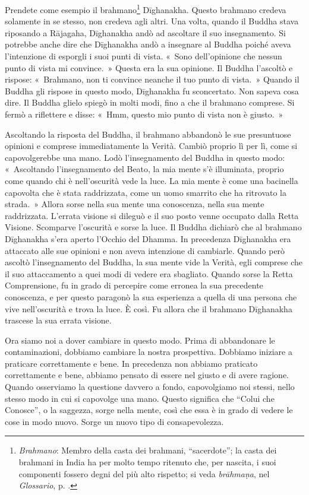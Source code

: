 Prendete come esempio il brahmano\footnote{\emph{Brahmano}: Membro della casta
  dei brahmani, ``sacerdote''; la casta dei brahmani in India ha per
  molto tempo ritenuto che, per nascita, i suoi componenti fossero degni
  del più alto rispetto; si veda \emph{brāhmaṇa}, nel \emph{Glossario}, p. \pageref{glossary-brahmana}.}
Dīghanakha. Questo brahmano credeva solamente in se stesso, non credeva
agli altri. Una volta, quando il Buddha stava riposando a Rājagaha,
Dīghanakha andò ad ascoltare il suo insegnamento. Si potrebbe anche dire
che Dīghanakha andò a insegnare al Buddha poiché aveva l'intenzione di
esporgli i suoi punti di vista. «~Sono dell'opinione che nessun punto di
vista mi convince.~» Questa era la sua opinione. Il Buddha l'ascoltò e
rispose: «~Brahmano, non ti convince neanche il tuo punto di vista.~»
Quando il Buddha gli rispose in questo modo, Dīghanakha fu sconcertato.
Non sapeva cosa dire. Il Buddha glielo spiegò in molti modi, fino a che
il brahmano comprese. Si fermò a riflettere e disse: «~Hmm, questo mio
punto di vista non è giusto.~»

Ascoltando la risposta del Buddha, il brahmano abbandonò le sue
presuntuose opinioni e comprese immediatamente la Verità. Cambiò proprio
lì per lì, come si capovolgerebbe una mano. Lodò l'insegnamento del
Buddha in questo modo: «~Ascoltando l'insegnamento del Beato, la mia
mente s'è illuminata, proprio come quando chi è nell'oscurità vede la
luce. La mia mente è come una bacinella capovolta che è stata
raddrizzata, come un uomo smarrito che ha ritrovato la strada.~» Allora
sorse nella sua mente una conoscenza, nella sua mente raddrizzata.
L'errata visione si dileguò e il suo posto venne occupato dalla Retta
Visione. Scomparve l'oscurità e sorse la luce. Il Buddha dichiarò che al
brahmano Dīghanakha s'era aperto l'Occhio del Dhamma. In precedenza
Dīghanakha era attaccato alle sue opinioni e non aveva intenzione di
cambiarle. Quando però ascoltò l'insegnamento del Buddha, la sua mente
vide la Verità, egli comprese che il suo attaccamento a quei modi di
vedere era sbagliato. Quando sorse la Retta Comprensione, fu in grado di
percepire come erronea la sua precedente conoscenza, e per questo
paragonò la sua esperienza a quella di una persona che vive
nell'oscurità e trova la luce. È così. Fu allora che il brahmano
Dīghanakha trascese la sua errata visione.

Ora siamo noi a dover cambiare in questo modo. Prima di abbandonare le
contaminazioni, dobbiamo cambiare la nostra prospettiva. Dobbiamo
iniziare a praticare correttamente e bene. In precedenza non abbiamo
praticato correttamente e bene, abbiamo pensato di essere nel giusto e
di avere ragione. Quando osserviamo la questione davvero a fondo,
capovolgiamo noi stessi, nello stesso modo in cui si capovolge una mano.
Questo significa che ``Colui che Conosce'', o la saggezza, sorge nella
mente, così che essa è in grado di vedere le cose in modo nuovo. Sorge
un nuovo tipo di consapevolezza.


